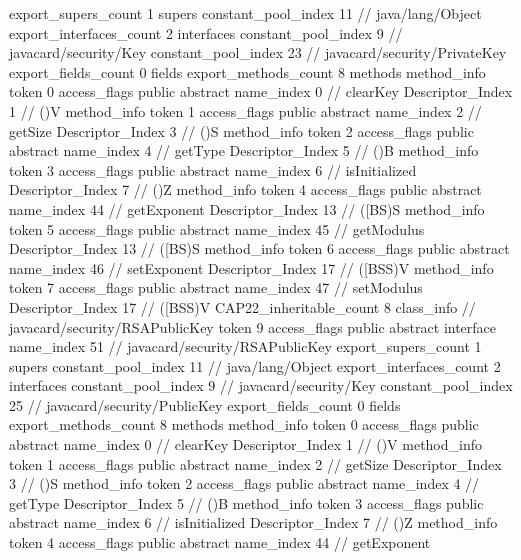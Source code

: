 {{{			export_supers_count	1
			supers {
				constant_pool_index	11		// java/lang/Object
			}
			export_interfaces_count	2
			interfaces {
				constant_pool_index	9		// javacard/security/Key
				constant_pool_index	23		// javacard/security/PrivateKey
			}
			export_fields_count	0
			fields {
			}
			export_methods_count	8
			methods {
				method_info {
					token	0
					access_flags	public abstract
					name_index	0		// clearKey
					Descriptor_Index	1		// ()V
				}
				method_info {
					token	1
					access_flags	public abstract
					name_index	2		// getSize
					Descriptor_Index	3		// ()S
				}
				method_info {
					token	2
					access_flags	public abstract
					name_index	4		// getType
					Descriptor_Index	5		// ()B
				}
				method_info {
					token	3
					access_flags	public abstract
					name_index	6		// isInitialized
					Descriptor_Index	7		// ()Z
				}
				method_info {
					token	4
					access_flags	public abstract
					name_index	44		// getExponent
					Descriptor_Index	13		// ([BS)S
				}
				method_info {
					token	5
					access_flags	public abstract
					name_index	45		// getModulus
					Descriptor_Index	13		// ([BS)S
				}
				method_info {
					token	6
					access_flags	public abstract
					name_index	46		// setExponent
					Descriptor_Index	17		// ([BSS)V
				}
				method_info {
					token	7
					access_flags	public abstract
					name_index	47		// setModulus
					Descriptor_Index	17		// ([BSS)V
				}
			}
			CAP22_inheritable_count	8
		}
		class_info {		// javacard/security/RSAPublicKey
			token	9
			access_flags	public abstract interface
			name_index	51		// javacard/security/RSAPublicKey
			export_supers_count	1
			supers {
				constant_pool_index	11		// java/lang/Object
			}
			export_interfaces_count	2
			interfaces {
				constant_pool_index	9		// javacard/security/Key
				constant_pool_index	25		// javacard/security/PublicKey
			}
			export_fields_count	0
			fields {
			}
			export_methods_count	8
			methods {
				method_info {
					token	0
					access_flags	public abstract
					name_index	0		// clearKey
					Descriptor_Index	1		// ()V
				}
				method_info {
					token	1
					access_flags	public abstract
					name_index	2		// getSize
					Descriptor_Index	3		// ()S
				}
				method_info {
					token	2
					access_flags	public abstract
					name_index	4		// getType
					Descriptor_Index	5		// ()B
				}
				method_info {
					token	3
					access_flags	public abstract
					name_index	6		// isInitialized
					Descriptor_Index	7		// ()Z
				}
				method_info {
					token	4
					access_flags	public abstract
					name_index	44		// getExponent
}}}}}
